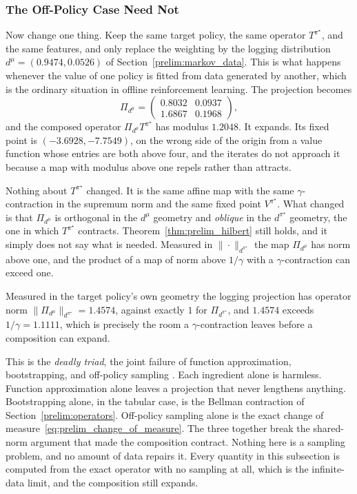 \subsubsection{The Off-Policy Case Need Not}

Now change one thing. Keep the same target policy, the same operator $T^{\pi^\star}$, and the same features, and only replace the weighting by the logging distribution $d^\mu = (0.9474, 0.0526)$ of Section~\ref{prelim:markov_data}. This is what happens whenever the value of one policy is fitted from data generated by another, which is the ordinary situation in offline reinforcement learning. The projection becomes
\begin{equation*}
\Pi_{d^\mu} = \begin{pmatrix} 0.8032 & 0.0937 \\ 1.6867 & 0.1968 \end{pmatrix},
\end{equation*}
and the composed operator $\Pi_{d^\mu} T^{\pi^\star}$ has modulus $1.2048$. It expands. Its fixed point is $(-3.6928, -7.7549)$, on the wrong side of the origin from a value function whose entries are both above four, and the iterates do not approach it because a map with modulus above one repels rather than attracts.

Nothing about $T^{\pi^\star}$ changed. It is the same affine map with the same $\gamma$-contraction in the supremum norm and the same fixed point $V^{\pi^\star}$. What changed is that $\Pi_{d^\mu}$ is orthogonal in the $d^\mu$ geometry and \emph{oblique} in the $d^{\pi^\star}$ geometry, the one in which $T^{\pi^\star}$ contracts. Theorem~\ref{thm:prelim_hilbert} still holds, and it simply does not say what is needed. Measured in $\|\cdot\|_{d^{\pi^\star}}$ the map $\Pi_{d^\mu}$ has norm above one, and the product of a map of norm above $1/\gamma$ with a $\gamma$-contraction can exceed one.

Measured in the target policy's own geometry the logging projection has operator norm $\|\Pi_{d^\mu}\|_{d^{\pi^\star}} = 1.4574$, against exactly $1$ for $\Pi_{d^{\pi^\star}}$, and $1.4574$ exceeds $1/\gamma = 1.1111$, which is precisely the room a $\gamma$-contraction leaves before a composition can expand.

This is the \emph{deadly triad}, the joint failure of function approximation, bootstrapping, and off-policy sampling \citep{sutton2018}. Each ingredient alone is harmless. Function approximation alone leaves a projection that never lengthens anything. Bootstrapping alone, in the tabular case, is the Bellman contraction of Section~\ref{prelim:operators}. Off-policy sampling alone is the exact change of measure~\eqref{eq:prelim_change_of_measure}. The three together break the shared-norm argument that made the composition contract. Nothing here is a sampling problem, and no amount of data repairs it. Every quantity in this subsection is computed from the exact operator with no sampling at all, which is the infinite-data limit, and the composition still expands.

